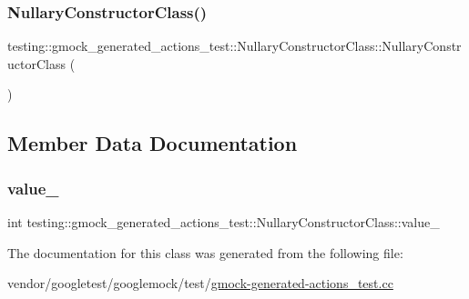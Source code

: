\subsubsection{\texorpdfstring{Nullary\+Constructor\+Class()}{NullaryConstructorClass()}}
{\footnotesize\ttfamily testing\+::gmock\+\_\+generated\+\_\+actions\+\_\+test\+::\+Nullary\+Constructor\+Class\+::\+Nullary\+Constructor\+Class (\begin{DoxyParamCaption}{ }\end{DoxyParamCaption})\hspace{0.3cm}{\ttfamily [inline]}}



\subsection{Member Data Documentation}
\mbox{\label{classtesting_1_1gmock__generated__actions__test_1_1_nullary_constructor_class_aa877ccc5aff335cbf81b8de90abee732}} 
\subsubsection{\texorpdfstring{value\+\_\+}{value\_}}
{\footnotesize\ttfamily int testing\+::gmock\+\_\+generated\+\_\+actions\+\_\+test\+::\+Nullary\+Constructor\+Class\+::value\+\_\+}



The documentation for this class was generated from the following file\+:\begin{DoxyCompactItemize}
\item 
vendor/googletest/googlemock/test/\hyperlink{gmock-generated-actions__test_8cc}{gmock-\/generated-\/actions\+\_\+test.\+cc}\end{DoxyCompactItemize}
